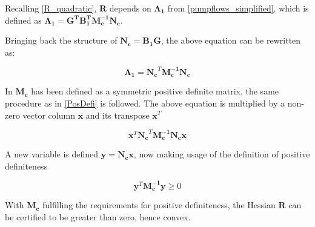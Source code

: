 Recalling \eqref{R_quadratic}, $\bm{R}$ depends on $\bm{\Lambda_1}$ from \eqref{pumpflows_simplified}, which is defined as $\bm{\Lambda_1} =\bm{G^T} \bm{B_{1}^T}\bm{M_c^{-1}}\bm{N_c}$.

Bringing back the structure of $\bm{N_c} = \bm{B_1} \bm{G}$, the above equation can be rewritten as:

\begin{equation}
\bm{\Lambda_1} =\bm{N_c}^{T} \bm{M_c^{-1}}\bm{N_c}
\end{equation}

In \secref{} $\bm{M_c}$ has been defined as a symmetric positive definite matrix, the same procedure as in \eqref{PosDefi} is followed. The above equation is multiplied by a non-zero vector column $\bm{x}$ and its transpose $\bm{x}^{T}$

\begin{equation}
	\bm{x}^{T}\bm{N_c}^{T} \bm{M_c^{-1}}\bm{N_c}\bm{x}
\end{equation}

A new variable is defined $\bm{y} = \bm{N_c}\bm{x}$, now making usage of the definition of positive definiteness 

\begin{equation}
	\bm{y}^{T} \bm{M_c^{-1}} \bm{y} \geqslant 0
	\label{Def_Mc}
\end{equation}

 With $\bm{M_c}$ fulfilling the requirements for positive definiteness, the Hessian $\bm{R}$ can be certified to be greater than zero, hence convex.






%
%
%
%
%



